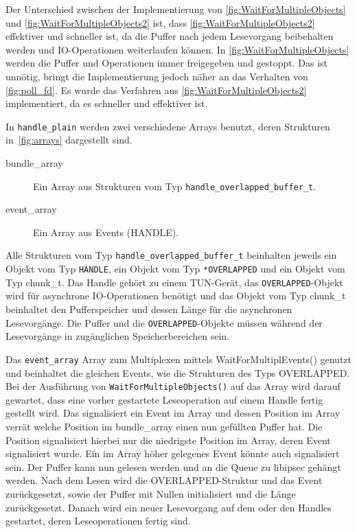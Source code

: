 {Der Unterschied zwischen der Implementierung von \autoref{fig:WaitForMultipleObjects}
und \autoref{fig:WaitForMultipleObjects2} ist, dass \autoref{fig:WaitForMultipleObjects2}
effektiver und schneller ist, da die Puffer nach jedem Lesevorgang beibehalten werden
und IO-Operationen weiterlaufen können.
In \autoref{fig:WaitForMultipleObjects} werden die Puffer und Operationen
immer freigegeben und gestoppt. Das ist unnötig, bringt die Implementierung
jedoch näher an das Verhalten von \autoref{fig:poll_fd}.
Es wurde das Verfahren aus \autoref{fig:WaitForMultipleObjects2} implementiert,
da es schneller und effektiver ist.

In \texttt{handle\_plain} werden zwei verschiedene Arrays benutzt, deren Strukturen in~\autoref{fig:arrays}
dargestellt sind.

\begin{description}
\item[bundle\_array] Ein Array aus Strukturen vom Typ \texttt{handle\_overlapped\_buffer\_t}. 
\item[event\_array] Ein Array aus Events (HANDLE).
\end{description}

Alle Strukturen vom Typ \texttt{handle\_overlapped\_buffer\_t} beinhalten jeweils ein Objekt
vom Typ \texttt{HANDLE}, ein Objekt vom Typ \texttt{*OVERLAPPED} und ein Objekt vom Typ chunk\_t.
Das Handle gehört zu einem TUN-Gerät, das \texttt{OVERLAPPED}-Objekt wird für asynchrone
IO-Operationen benötigt und das Objekt vom Typ chunk\_t beinhaltet den Pufferspeicher und dessen Länge
für die asynchronen Lesevorgänge. Die Puffer und die \texttt{OVERLAPPED}-Objekte
müssen während der Lesevorgänge in zugänglichen Speicherbereichen sein.

Das \texttt{event\_array} Array zum Multiplexen mittels WaitForMultiplEvents() genutzt und
beinhaltet die gleichen Events, wie die Strukturen des Typs OVERLAPPED.
Bei der Ausführung von \texttt{WaitForMultipleObjects()} auf das Array wird darauf gewartet, dass
eine vorher gestartete Leseoperation auf einem Handle fertig gestellt wird.
Das signalisiert ein Event im Array und dessen Position im Array verrät welche
Position im bundle\_array einen nun gefüllten Puffer hat. Die Position signalisiert
hierbei nur die niedrigste Position im Array, deren Event signalisiert wurde. Ein
im Array höher gelegenes Event könnte auch signalisiert sein.
Der Puffer kann nun gelesen
werden und an die Queue zu libipsec gehängt werden. Nach dem Lesen wird die OVERLAPPED-Struktur
und das Event zurückgesetzt, sowie der Puffer mit Nullen initialisiert und die Länge zurückgesetzt.
Danach wird ein neuer Lesevorgang auf dem oder den Handles gestartet, deren Leseoperationen
fertig sind.

}
